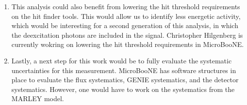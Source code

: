 \begin{enumerate}
 \item This analysis could also benefit from lowering the hit threshold requirements on the hit finder tools. This would allow us to identify less energetic activity, which would be interesting for a second generation of this analysis, in which the deexcitation photons are included in the signal. Christopher Hilgenberg is currently wokring on lowering the hit threshold requirements in MicroBooNE. 
 
 \item Lastly, a next step for this work would be to fully evaluate the systematic uncertainties for this measurement. MicroBooNE has software structures in place to evaluate the flux systematics, GENIE systematics, and the detector systematics. However, one would have to work on the systematics from the MARLEY model. 
\end{enumerate}
